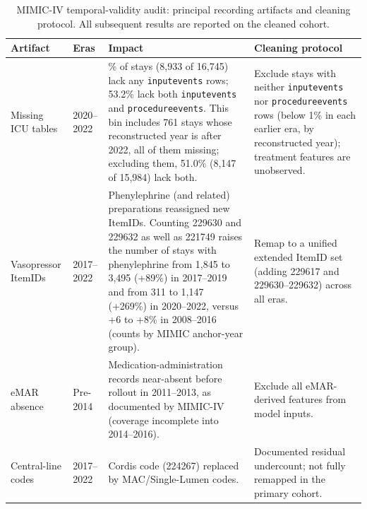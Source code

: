\documentclass[10pt,a4paper,twocolumn]{article}
\begin{document}
	\begin{table}[t]
		\centering
		\caption{MIMIC-IV temporal-validity audit: principal recording artifacts and cleaning protocol. All subsequent results are reported on the cleaned cohort.}
		\label{tab:audit}
		\small
		\begin{tabularx}{\textwidth}{l p{1.6cm} >{\raggedright\arraybackslash}p{5.4cm} >{\raggedright\arraybackslash}X}
			\toprule
			\textbf{Artifact} & \textbf{Eras} & \textbf{Impact} & \textbf{Cleaning protocol} \\
			\midrule
			Missing ICU tables & 2020--2022 & 53.3\% of stays (8,933 of 16,745) lack any \texttt{inputevents} rows; 53.2\% lack both \texttt{inputevents} and \texttt{procedureevents}. This bin includes 761 stays whose reconstructed year is after 2022, all of them missing; excluding them, 51.0\% (8,147 of 15,984) lack both. & Exclude stays with neither \texttt{inputevents} nor \texttt{procedureevents} rows (below 1\% in each earlier era, by reconstructed year); treatment features are unobserved. \\
			\addlinespace
			Vasopressor ItemIDs & 2017--2022 & Phenylephrine (and related) preparations reassigned new ItemIDs. Counting 229630 and 229632 as well as 221749 raises the number of stays with phenylephrine from 1,845 to 3,495 (+89\%) in 2017--2019 and from 311 to 1,147 (+269\%) in 2020--2022, versus +6 to +8\% in 2008--2016 (counts by MIMIC anchor-year group). & Remap to a unified extended ItemID set (adding 229617 and 229630--229632) across all eras. \\
			\addlinespace
			eMAR absence & Pre-2014 & Medication-administration records near-absent before rollout in 2011--2013, as documented by MIMIC-IV (coverage incomplete into 2014--2016). & Exclude all eMAR-derived features from model inputs. \\
			\addlinespace
			Central-line codes & 2017--2022 & Cordis code (224267) replaced by MAC/Single-Lumen codes. & Documented residual undercount; not fully remapped in the primary cohort. \\
			\bottomrule
		\end{tabularx}
	\end{table}
	
\end{document}
